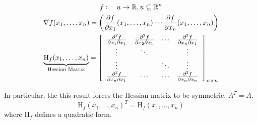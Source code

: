 \begin{gather*}
    f: \quad u\to\mathbb{R}, u\subseteq\mathbb{R}^n\\
    \nabla f(x_1,\ldots,x_n) = \left(\frac{\partial f}{\partial x_1}(x_1,\ldots,x_n) \cdots \frac{\partial f}{\partial x_n}(x_1,\ldots,x_n)\right)\\
    \underbrace{\text{H}_f(x_1,\ldots,x_n)}_{\text{Hessian Matrix}} = 
    \left[\begin{array}{cccc}
        \frac{\partial^2 f}{\partial x_1\partial x_1} & \frac{\partial^2 f}{\partial x_2\partial x_1} & \cdots & \frac{\partial^2 f}{\partial x_n\partial x_1}\\
        \vdots & \ddots & & \vdots\\
        \vdots & & \ddots & \vdots\\
        \frac{\partial^2 f}{\partial x_n\partial x_1} & \cdots & \cdots & \frac{\partial^2 f}{\partial x_n\partial x_n}
    \end{array}\right]_{n\times n}
\end{gather*}

In particular, the this result forces the Hessian matrix to be symmetric, $A^T = A$.
\begin{equation*}
    \text{H}_f(x_1,\ldots,x_n)^T = \text{H}_f(x_1,\ldots,x_n)
\end{equation*}
where $\text{H}_f$ defines a quadratic form.

